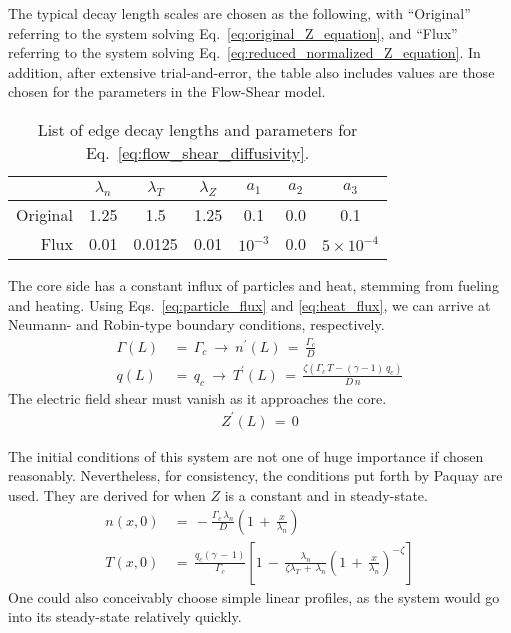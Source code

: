 The typical decay length scales are chosen as the following, with ``Original'' referring to the system solving Eq.~\ref{eq:original_Z_equation}, and ``Flux'' referring to the system solving Eq.~\ref{eq:reduced_normalized_Z_equation}.
In addition, after extensive trial-and-error, the table also includes values are those chosen for the parameters in the Flow-Shear model.
\begin{table}[h] %
\centering
	\begin{tabular}{r|ccc|ccc}
		& $\lambda_n$ & $\lambda_T$ & $\lambda_Z$ & $a_1$ & $a_2$ & $a_3$ \\ \hline
		Original & 1.25 & 1.5 & 1.25 & 0.1 & 0.0 & 0.1 \\ \hline
		Flux & 0.01 & 0.0125 & 0.01 & $10^{-3}$ & 0.0 & $5\times 10^{-4}$
	\end{tabular}
	\caption{List of edge decay lengths and parameters for Eq.~\ref{eq:flow_shear_diffusivity}.}
	\label{table:decay_lengths_FS_params}
\end{table}

The core side has a constant influx of particles and heat, stemming from fueling and heating.
Using Eqs.~\ref{eq:particle_flux} and \ref{eq:heat_flux}, we can arrive at Neumann- and Robin-type boundary conditions, respectively.
\begin{align} %
	\Gamma(L) \,&=\, \Gamma_c ~\longrightarrow~ n^\prime(L)
		\,=\, \frac{\Gamma_c}{D} \label{eq:core_particle_flux}\\
	q(L) \,&=\, q_c ~\longrightarrow~ T^\prime(L) \,=\, \frac{\zeta(
		\Gamma_c \, T - (\gamma - 1)\,q_c)}{D \, n} \label{eq:core_heat_flux}
\end{align}
The electric field shear must vanish as it approaches the core.
\begin{align} %
	Z^\prime(L) \,=\, 0 \label{eq:core_Z_boundary}
\end{align}

The initial conditions of this system are not one of huge importance if chosen reasonably.
Nevertheless, for consistency, the conditions put forth by Paquay \cite{paquay_studying_2012} are used.
They are derived for when $Z$ is a constant and in steady-state.
\begin{align} %
	n(x,0) \,&=\, -\frac{\Gamma_c \, \lambda_n}{D} \left(1 \,+\,
		\frac{x}{\lambda_n}\right) \label{eq:n_initial} \\
	T(x,0) \,&=\, \frac{q_c (\gamma \,-\, 1)}{\Gamma_c} \left[1 \,-\,
		\frac{\lambda_n}{\zeta\lambda_T \,+\, \lambda_n} \left(1 \,+\,
		\frac{x}{\lambda_n}\right)^{-\zeta}\right] \label{eq:T_initial}
\end{align}
One could also conceivably choose simple linear profiles, as the system would go into its steady-state relatively quickly.

